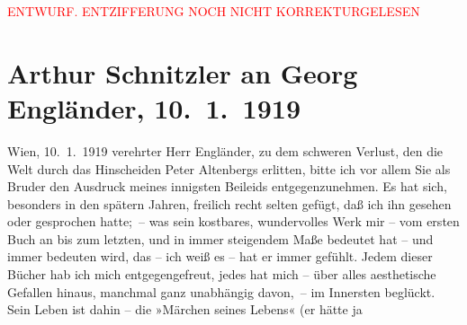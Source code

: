 
\begin{center}
            \textcolor{red}{ENTWURF. ENTZIFFERUNG NOCH NICHT KORREKTURGELESEN}
                      \end{center}
            
               \section[Arthur Schnitzler an Georg Engländer, 10. 1. 1919]{ Arthur Schnitzler an Georg Engländer, 10. 1. 1919}\nopagebreak{}\rehead{ }\begin{ledgroupsized}[t]{13cm}\normalsize\beginnumbering{} \toendnotes[C]{\smallbreak\pagebreak[2]} 
\toendnotes[C]{\smallbreak}\pstart
           \raggedleft{}{\pb}Wien, 10. 1. 1919\pend
           \pstart{}verehrter Herr Engländer,\pend\pstart
           zu dem schweren Verlust, den die Welt durch das Hinscheiden Peter Altenbergs erlitten, bitte ich vor allem Sie als
                    Bruder den Ausdruck meines innigsten Beileids entgegenzunehmen. Es hat sich,
                    besonders in den spätern Jahren, freilich recht selten gefügt, daß ich ihn
                    gesehen oder gesprochen hatte; – was sein kostbares, wundervolles Werk mir – vom
                    ersten Buch an bis zum letzten, und in immer
                    steigendem Maße bedeutet hat – und immer bedeuten wird, das – ich weiß es – hat
                    er immer gefühlt. Jedem dieser Bücher hab ich mich entgegengefreut, jedes hat
                    mich – über alles aesthetische Gefallen hinaus, manchmal ganz unabhängig
                    davon, – im Innersten beglückt. Sein Leben ist dahin – die »Märchen seines Lebens« (er hätte ja

\end{ledgroupsized}
